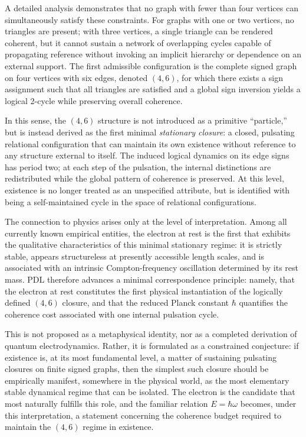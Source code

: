 \documentclass{article}
\theoremstyle{definition}
\newcommand{\PDL}{\ensuremath{\mathrm{PDL}}}
\begin{document}
A detailed analysis demonstrates that no graph with fewer than four vertices can simultaneously satisfy these constraints.
For graphs with one or two vertices, no triangles are present; with three vertices, a single triangle can be rendered coherent, but it cannot sustain a network of overlapping cycles capable of propagating reference without invoking an implicit hierarchy or dependence on an external support.%
\cite{PDL_Minimal_Closures_2026}
The first admissible configuration is the complete signed graph on four vertices with six edges, denoted \((4,6)\), for which there exists a sign assignment such that all triangles are satisfied and a global sign inversion yields a logical 2-cycle while preserving overall coherence.%
\cite{PDL_Main_2026}

In this sense, the \((4,6)\) structure is not introduced as a primitive “particle,” but is instead derived as the first minimal \emph{stationary closure}: a closed, pulsating relational configuration that can maintain its own existence without reference to any structure external to itself.
The induced logical dynamics on its edge signs has period two; at each step of the pulsation, the internal distinctions are redistributed while the global pattern of coherence is preserved.
At this level, existence is no longer treated as an unspecified attribute, but is identified with being a self-maintained cycle in the space of relational configurations.%
\cite{PDL_Main_2026,PDL_Position_2026}

The connection to physics arises only at the level of interpretation.
Among all currently known empirical entities, the electron at rest is the first that exhibits the qualitative characteristics of this minimal stationary regime: it is strictly stable, appears structureless at presently accessible length scales, and is associated with an intrinsic Compton-frequency oscillation determined by its rest mass.%
\cite{PDL_Main_2026}
\PDL{} therefore advances a minimal correspondence principle: namely, that the electron at rest constitutes the first physical instantiation of the logically defined \((4,6)\) closure, and that the reduced Planck constant \(\hbar\) quantifies the coherence cost associated with one internal pulsation cycle.%
\cite{PDL_Main_2026,PDL_Position_2026}

This is not proposed as a metaphysical identity, nor as a completed derivation of quantum electrodynamics.
Rather, it is formulated as a constrained conjecture: if existence is, at its most fundamental level, a matter of sustaining pulsating closures on finite signed graphs, then the simplest such closure should be empirically manifest, somewhere in the physical world, as the most elementary stable dynamical regime that can be isolated.
The electron is the candidate that most naturally fulfills this role, and the familiar relation \(E = \hbar \omega\) becomes, under this interpretation, a statement concerning the coherence budget required to maintain the \((4,6)\) regime in existence.%
\cite{PDL_Main_2026}
\end{document}
